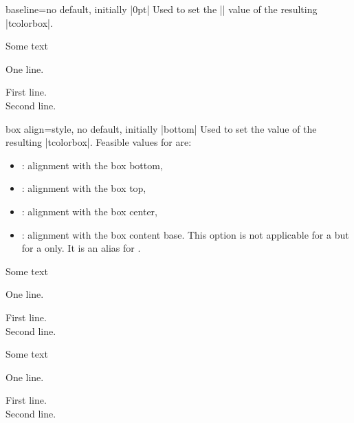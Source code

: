 \clearpage

\begin{docTcbKey}{baseline}{=}{no default, initially |0pt|}
  Used to set the |\pgfsetbaseline| value of the resulting |tcolorbox|.
\begin{dispExample}
Some text\dotfill
\begin{tcolorbox}[baseline=3mm]
One line.
\end{tcolorbox}
\begin{tcolorbox}[baseline=3mm]
First line.\\Second line.
\end{tcolorbox}
\end{dispExample}
\end{docTcbKey}


\begin{docTcbKey}[][doc new=2014-10-10]{box align}{=}{style, no default, initially |bottom|}
  Used to set the  value of the resulting |tcolorbox|.
  Feasible values for  are:
  \begin{itemize}
  \item{}: alignment with the box bottom,
  \item{}: alignment with the box top,
  \item{}: alignment with the box center,
  \item{}: alignment with the box content base. This option
    is not applicable for a  but for a  only.
    It is an alias for .
  \end{itemize}

\begin{dispExample}
Some text\dotfill
\begin{tcolorbox}[box align=bottom]
One line.
\end{tcolorbox}
\begin{tcolorbox}[box align=bottom]
First line.\\Second line.
\end{tcolorbox}
\end{dispExample}

\begin{dispExample}
Some text\dotfill
\begin{tcolorbox}[box align=top]
One line.
\end{tcolorbox}
\begin{tcolorbox}[box align=top]
First line.\\Second line.
\end{tcolorbox}
\end{dispExample}


\end{docTcbKey}
